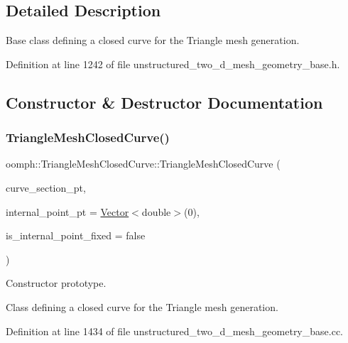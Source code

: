 \subsection{Detailed Description}
Base class defining a closed curve for the Triangle mesh generation. 

Definition at line 1242 of file unstructured\+\_\+two\+\_\+d\+\_\+mesh\+\_\+geometry\+\_\+base.\+h.



\subsection{Constructor \& Destructor Documentation}
\mbox{\label{classoomph_1_1TriangleMeshClosedCurve_af24c98c4ee0fa9286d8d32df39980ad8}} 
\subsubsection{\texorpdfstring{Triangle\+Mesh\+Closed\+Curve()}{TriangleMeshClosedCurve()}}
{\footnotesize\ttfamily oomph\+::\+Triangle\+Mesh\+Closed\+Curve\+::\+Triangle\+Mesh\+Closed\+Curve (\begin{DoxyParamCaption}\item[{const \hyperlink{classoomph_1_1Vector}{Vector}$<$ \hyperlink{classoomph_1_1TriangleMeshCurveSection}{Triangle\+Mesh\+Curve\+Section} $\ast$$>$ \&}]{curve\+\_\+section\+\_\+pt,  }\item[{const \hyperlink{classoomph_1_1Vector}{Vector}$<$ double $>$ \&}]{internal\+\_\+point\+\_\+pt = {\ttfamily \hyperlink{classoomph_1_1Vector}{Vector}$<$double$>$(0)},  }\item[{const bool \&}]{is\+\_\+internal\+\_\+point\+\_\+fixed = {\ttfamily false} }\end{DoxyParamCaption})}



Constructor prototype. 

Class defining a closed curve for the Triangle mesh generation. 

Definition at line 1434 of file unstructured\+\_\+two\+\_\+d\+\_\+mesh\+\_\+geometry\+\_\+base.\+cc.



